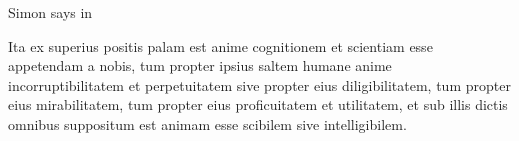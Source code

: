 \documentclass{article}
\begin{document}
Simon says in 


\beginnumbering
\pstart
Ita ex superius positis palam est anime cognitionem et
scientiam esse appetendam a nobis, tum propter ipsius saltem
humane anime incorruptibilitatem et perpetuitatem sive
propter eius diligibilitatem, tum propter eius mirabilitatem, tum propter eius
proficuitatem et utilitatem, et sub illis dictis omnibus suppositum est animam
esse scibilem sive intelligibilem. 
\pend
\endnumbering 
\end{document}
